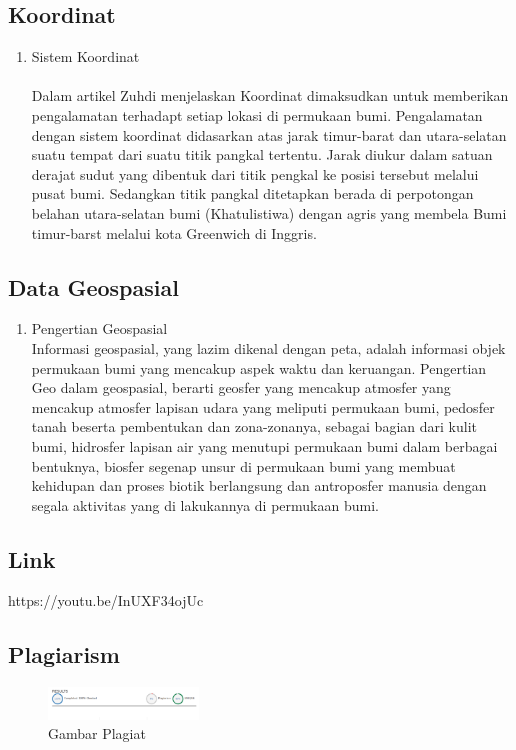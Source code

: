 \subsection{Koordinat}
\begin{enumerate}
\item Sistem Koordinat\\
\\
Dalam artikel Zuhdi menjelaskan Koordinat dimaksudkan untuk memberikan pengalamatan terhadapt setiap lokasi di permukaan  bumi. Pengalamatan dengan sistem koordinat didasarkan atas jarak timur-barat dan utara-selatan suatu tempat dari suatu titik pangkal tertentu. Jarak diukur dalam satuan derajat sudut yang dibentuk dari titik pengkal ke posisi tersebut melalui pusat bumi. Sedangkan titik pangkal ditetapkan berada di perpotongan belahan utara-selatan bumi (Khatulistiwa) dengan agris yang membela Bumi timur-barst melalui kota Greenwich di Inggris.\\
\end{enumerate}

\subsection{Data Geospasial}
\begin{enumerate}
\item Pengertian Geospasial\\
Informasi geospasial, yang lazim dikenal dengan peta, adalah informasi objek permukaan bumi yang mencakup aspek waktu dan keruangan. Pengertian Geo dalam geospasial, berarti geosfer yang mencakup atmosfer yang mencakup atmosfer lapisan udara yang meliputi permukaan bumi, pedosfer tanah beserta pembentukan dan zona-zonanya, sebagai bagian dari kulit bumi, hidrosfer lapisan air yang menutupi permukaan bumi dalam berbagai bentuknya, biosfer segenap unsur di permukaan bumi yang membuat kehidupan dan proses biotik  berlangsung dan antroposfer manusia dengan segala aktivitas yang di lakukannya di permukaan bumi.\\

\end{enumerate}
\subsection{Link}
https://youtu.be/InUXF34ojUc

\subsection{Plagiarism}
\begin{figure}[H]
	\includegraphics[width=4cm]{figures/Tugas1/1174062/plagiat.png}
	\centering
	\caption{Gambar Plagiat}
\end{figure}